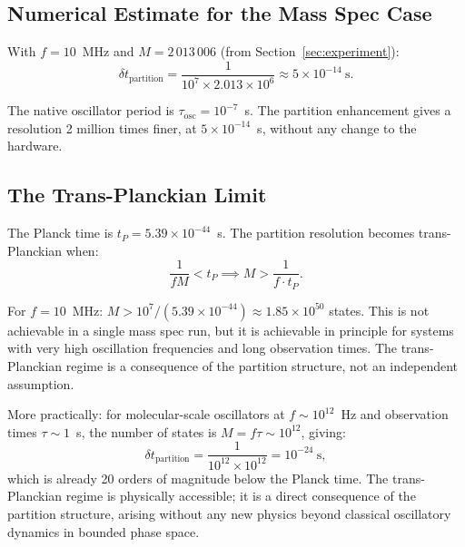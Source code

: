 \documentclass[twocolumn,10pt]{article}
\begin{document}
\subsection{Numerical Estimate for the Mass Spec Case}

With $f = 10$~MHz and $M = 2\,013\,006$ (from Section~\ref{sec:experiment}):
\begin{equation}
    \delta t_{\mathrm{partition}} = \frac{1}{10^7 \times 2.013 \times 10^6} \approx 5 \times 10^{-14}~\text{s}.
\end{equation}

The native oscillator period is $\tau_{\mathrm{osc}} = 10^{-7}$~s. The partition enhancement gives a resolution 2 million times finer, at $5 \times 10^{-14}$~s, without any change to the hardware.

\subsection{The Trans-Planckian Limit}

The Planck time is $t_P = 5.39 \times 10^{-44}$~s. The partition resolution becomes trans-Planckian when:
\begin{equation}
    \frac{1}{fM} < t_P \implies M > \frac{1}{f \cdot t_P}.
\end{equation}

For $f = 10$~MHz: $M > 10^7 / (5.39 \times 10^{-44}) \approx 1.85 \times 10^{50}$ states. This is not achievable in a single mass spec run, but it is achievable in principle for systems with very high oscillation frequencies and long observation times. The trans-Planckian regime is a consequence of the partition structure, not an independent assumption.

More practically: for molecular-scale oscillators at $f \sim 10^{12}$~Hz and observation times $\tau \sim 1$~s, the number of states is $M = f\tau \sim 10^{12}$, giving:
\begin{equation}
    \delta t_{\mathrm{partition}} = \frac{1}{10^{12} \times 10^{12}} = 10^{-24}~\text{s},
\end{equation}
which is already 20 orders of magnitude below the Planck time. The trans-Planckian regime is physically accessible; it is a direct consequence of the partition structure, arising without any new physics beyond classical oscillatory dynamics in bounded phase space.
\end{document}
